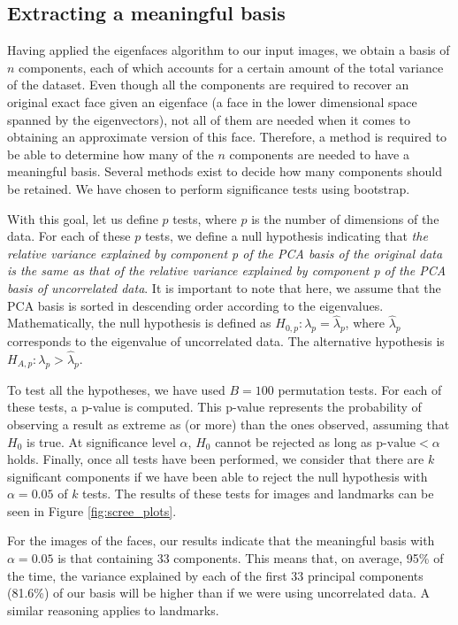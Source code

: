 \documentclass{article}
\begin{document}
\subsection{Extracting a meaningful basis}

Having applied the eigenfaces algorithm to our input images, we obtain a basis of $n$ components, each of which accounts for a certain amount of the total variance of the dataset. Even though all the components are required to recover an original exact face given an eigenface (a face in the lower dimensional space spanned by the eigenvectors), not all of them are needed when it comes to obtaining an approximate version of this face. Therefore, a method is required to be able to determine how many of the $n$ components are needed to have a meaningful basis. Several methods exist to decide how many components should be retained. We have chosen to perform significance tests using bootstrap.

With this goal, let us define $p$ tests, where $p$ is the number of dimensions of the data. For each of these $p$ tests, we define a null hypothesis indicating that \textit{the relative variance explained by component p of the PCA basis of the original data is the same as that of the relative variance explained by component p of the PCA basis of uncorrelated data}. It is important to note that here, we assume that the PCA basis is sorted in descending order according to the eigenvalues. Mathematically, the null hypothesis is defined as $H_{0,p}: \lambda_p = \hat{\lambda}_p$, where $\hat{\lambda}_p$ corresponds to the eigenvalue of uncorrelated data. The alternative hypothesis is $H_{A,p}: \lambda_p > \hat{\lambda}_p$.

To test all the hypotheses, we have used $B = 100$ permutation tests. For each of these tests, a p-value is computed. This p-value represents the probability of observing a result as extreme as (or more) than the ones observed, assuming that $H_0$ is true. At significance level $\alpha$, $H_0$ cannot be rejected as long as $\text{p-value} < \alpha$ holds. Finally, once all tests have been performed, we consider that there are $k$ significant components if we have been able to reject the null hypothesis with $\alpha = 0.05$ of $k$ tests. The results of these tests for images and landmarks can be seen in Figure \ref{fig:scree_plots}.

For the images of the faces, our results indicate that the meaningful basis with $\alpha = 0.05$ is that containing 33 components. This means that, on average, 95\% of the time, the variance explained by each of the first 33 principal components (81.6\%) of our basis will be higher than if we were using uncorrelated data. A similar reasoning applies to landmarks.
\end{document}
